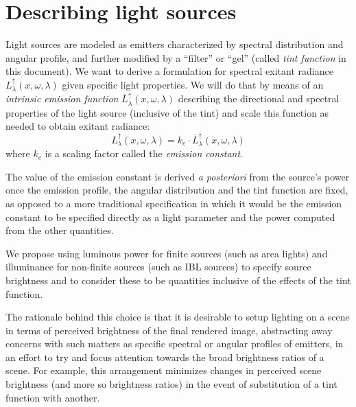 
\section{Describing light sources}\label{ch:specification}

Light sources are modeled as emitters characterized by spectral distribution
and angular profile, and further modified by a ``filter'' or ``gel'' (called
\textsl{tint function} in this document). We want to derive a formulation for
spectral exitant radiance $L_{\lambda}^\uparrow(x,\omega,\lambda)$ given
specific light properties. We will do that by means of an \textsl{intrinsic
emission function} $\overline{L}^\uparrow_{\lambda}(x,\omega,\lambda)$
describing the directional and spectral properties of the light source
(inclusive of the tint) and scale this function as needed to obtain exitant
radiance:
\begin{equation}
L_{\lambda}^\uparrow(x, \omega, \lambda) = k_e \cdot
\overline{L}^\uparrow_{\lambda}(x, \omega, \lambda)
\end{equation}
where $k_e$ is a scaling factor called the \textsl{emission constant}.


The value of the emission constant is derived \emph{a posteriori} from the
source's power once the emission profile, the angular distribution and the tint
function are fixed, as opposed to a more traditional specification in which it
would be the emission constant to be specified directly as a light parameter and
the power computed from the other quantities.

We propose using luminous power for finite
sources (such as area lights) and illuminance for non-finite sources (such as
\gls{IBL} sources) to specify source brightness and to consider these to be
quantities inclusive of the effects of the tint function.

The rationale behind this choice is that it is desirable to setup lighting
on a scene in terms of perceived brightness of the final rendered image,
abstracting away concerns with such matters as specific spectral or angular
profiles of emitters, in an effort to try and focus attention towards the broad
brightness ratios of a scene.
For example, this arrangement minimizes changes in perceived scene brightness
(and more so brightness ratios) in the event of substitution of a tint function
with another.

